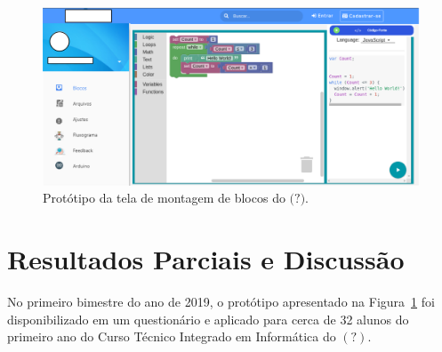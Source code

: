 \documentclass[12pt]{article}
\begin{document}
	\begin{figure}[h]
		\centering
		\includegraphics[scale=0.3]{bloc.png}
		\caption{Protótipo da tela de montagem de blocos do $\textbf{(?)}$.}
		\label{fig2}
	\end{figure}

\section{Resultados Parciais e Discussão}
No primeiro bimestre do ano de 2019, o protótipo apresentado na Figura~\ref{fig2} foi disponibilizado em um questionário e aplicado para cerca de 32 alunos do primeiro ano do Curso Técnico Integrado em Informática do $(?)$.
\end{document}
